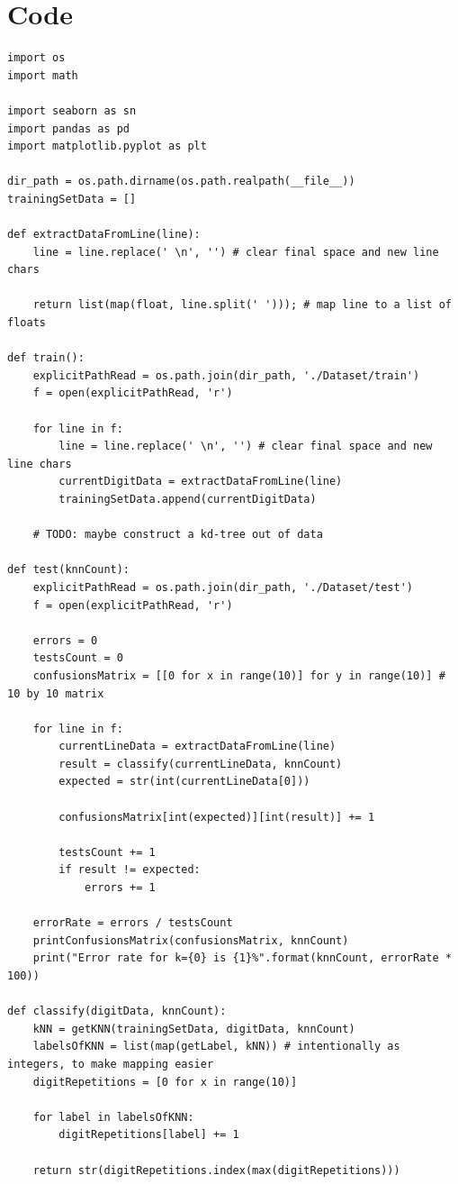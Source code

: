 \section*{Code}
\begin{lstlisting}[style=py]
import os
import math

import seaborn as sn
import pandas as pd
import matplotlib.pyplot as plt

dir_path = os.path.dirname(os.path.realpath(__file__))
trainingSetData = []

def extractDataFromLine(line):
	line = line.replace(' \n', '') # clear final space and new line chars
	
	return list(map(float, line.split(' '))); # map line to a list of floats

def train():
	explicitPathRead = os.path.join(dir_path, './Dataset/train')
	f = open(explicitPathRead, 'r')

	for line in f:
		line = line.replace(' \n', '') # clear final space and new line chars
		currentDigitData = extractDataFromLine(line)
		trainingSetData.append(currentDigitData)

	# TODO: maybe construct a kd-tree out of data

def test(knnCount):
	explicitPathRead = os.path.join(dir_path, './Dataset/test')
	f = open(explicitPathRead, 'r')

	errors = 0
	testsCount = 0
	confusionsMatrix = [[0 for x in range(10)] for y in range(10)] # 10 by 10 matrix

	for line in f:
		currentLineData = extractDataFromLine(line)
		result = classify(currentLineData, knnCount)
		expected = str(int(currentLineData[0]))

		confusionsMatrix[int(expected)][int(result)] += 1

		testsCount += 1
		if result != expected:
			errors += 1

	errorRate = errors / testsCount
	printConfusionsMatrix(confusionsMatrix, knnCount)
	print("Error rate for k={0} is {1}%".format(knnCount, errorRate * 100))

def classify(digitData, knnCount):
	kNN = getKNN(trainingSetData, digitData, knnCount)
	labelsOfKNN = list(map(getLabel, kNN)) # intentionally as integers, to make mapping easier
	digitRepetitions = [0 for x in range(10)]

	for label in labelsOfKNN:
		digitRepetitions[label] += 1

	return str(digitRepetitions.index(max(digitRepetitions)))



\end{lstlisting}

